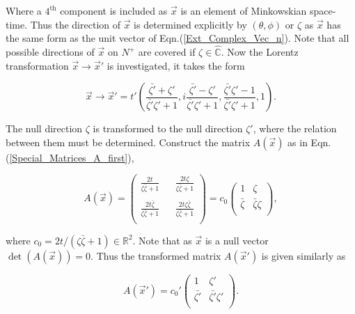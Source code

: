 \noindent Where a $4^{\text{th}}$ component is included as $\vec{x}$ is an element of Minkowskian space-time. Thus the direction of $\vec{x}$ is determined explicitly by $(\theta,\phi)$ or $\zeta$ as $\vec{x}$ has the same form as the unit vector of Eqn.(\ref{Ext_Complex_Vec_n}). Note that all possible directions of $\vec{x}$ on $N^{+}$ are covered if $\zeta \in \hat{\mathbb{C}}$. Now the Lorentz transformation $\vec{x} \rightarrow \vec{x}'$ is investigated, it takes the form  

\begin{equation*}
\vec{x} \rightarrow \vec{x}' = t'\left( \frac{\bar{\zeta'} + \zeta'}{\bar{\zeta'}\zeta' + 1}  ,i\frac{\bar{\zeta'} - \zeta'}{\bar{\zeta'}\zeta' + 1}, \frac{\bar{\zeta'}\zeta' - 1}{\bar{\zeta'}\zeta' + 1},1  \right).
\end{equation*}

\noindent The null direction $\zeta$ is transformed to the null direction $\zeta'$, where the relation between them must be determined. Construct the matrix $A(\vec{x})$ as in Eqn.(\ref{Special_Matrices_A_first}),

\begin{equation*}
A(\vec{x}) = 
\left(
\begin{array}{ccc}
\frac{2t}{\zeta\bar{\zeta}+1} & & \frac{2t\zeta}{\zeta\bar{\zeta}+1} \\
 & & \\
\frac{2t\bar{\zeta}}{\zeta\bar{\zeta}+1} & & \frac{2t\zeta\bar{\zeta}}{\zeta\bar{\zeta}+1} \\
\end{array}
\right)
=
c_0\left(
\begin{array}{cc}
1           & \zeta \\ 
\bar{\zeta} & \bar{\zeta}\zeta \\ 
\end{array}
\right),
\end{equation*}

\noindent where $c_0 = 2t/(\zeta\bar{\zeta}+1) \in \mathbb{R}^2$. Note that as $\vec{x}$ is a null vector $\det{(A(\vec{x}))} = 0$. Thus the transformed matrix $A(\vec{x}')$ is given similarly as

\begin{equation*}
A(\vec{x}') = 
{c_0}'\left(
\begin{array}{cc}
1           & \zeta' \\ 
\bar{\zeta'} & \bar{\zeta'}\zeta' \\ 
\end{array}
\right).
\end{equation*}

